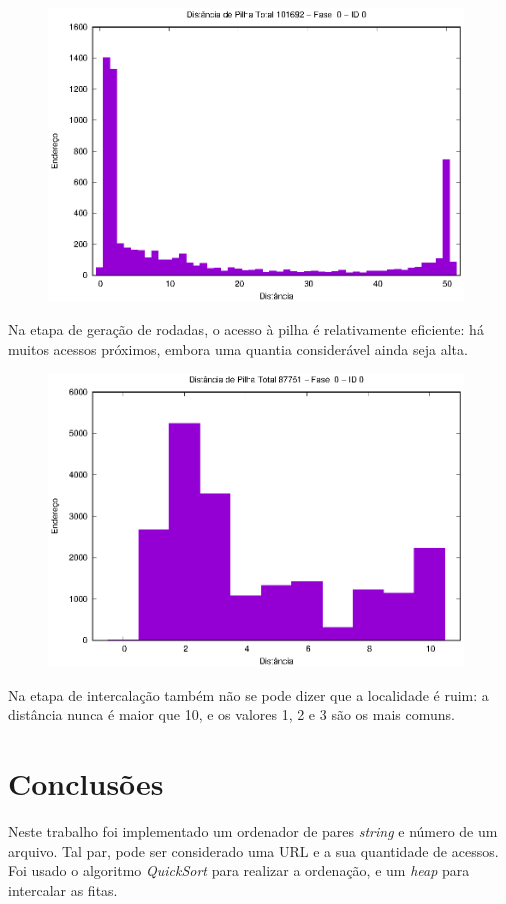\documentclass{article}
\begin{document}
\begin{figure}[H]
	\includegraphics[width=11cm]{1a-fase-hist-0-0.eps}
	\centering
\end{figure}

Na etapa de geração de rodadas, o acesso à pilha é relativamente eficiente: há muitos acessos próximos, embora uma quantia considerável ainda seja alta.

\begin{figure}[H]
	\includegraphics[width=11cm]{2a-fase-hist-0-0.eps}
	\centering
\end{figure}

Na etapa de intercalação também não se pode dizer que a localidade é ruim: a distância nunca é maior que 10, e os valores 1, 2 e 3 são os mais comuns.

\section{Conclusões}

Neste trabalho foi implementado um ordenador de pares \textit{string} e número de um arquivo. Tal par, pode ser considerado uma URL e a sua quantidade de acessos. Foi usado o algoritmo \textit{QuickSort} para realizar a ordenação, e um \textit{heap} para intercalar as fitas.
\end{document}

